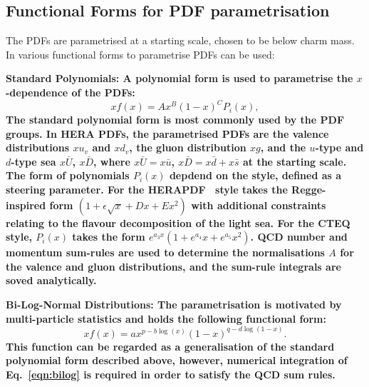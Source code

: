 \subsection{Functional Forms for PDF parametrisation}
The PDFs are parametrised at a starting scale, chosen to be below charm mass.
In \fitter various functional forms to parametrise PDFs can be used:
\begin{description}
\item \bf {Standard Polynomials:} \rm
A polynomial form is used to parametrise the $x$-dependence of the PDFs:
\begin{equation}
 xf(x) = A x^{B} (1-x)^{C} P_i(x),
\label{eqn:pdf_std}
\end{equation}
The standard polynomial form is most commonly used by the PDF groups.
In HERA PDFs, the parametrised PDFs are the valence distributions
$xu_v$ and $xd_v$, the gluon distribution $xg$, and the $u$-type and $d$-type sea 
$x\bar{U}$, $x\bar{D}$, where $x\bar{U} = x\bar{u}$, 
$x\bar{D} = x\bar{d} +x\bar{s}$ at the starting scale. 
The form of polynomials $P_i(x)$ depdend on the style, defined as a steering parameter. 
For the HERAPDF~\cite{h1zeus:2009wt} style takes the Regge-inspired form  
$(1 + \epsilon \sqrt{x} + D x + E x^2)$
with additional constraints relating to the flavour decomposition of the 
light sea. 
For the CTEQ style, $P_i(x)$ takes the form $e^{a_3x} (1 + e^{a_4} x + e^{a_5} x^2)$.
QCD number and momentum sum-rules are used to determine the normalisations $A$ for the valence and gluon
distributions, and the sum-rule integrals are soved analytically.

\item \bf {Bi-Log-Normal Distributions:} \rm
The parametrisation is motivated by multi-particle statistics
and holds the following functional form:
\begin{equation}
 xf(x)=a x^{p-b\log(x)}(1-x)^{q-d \log(1-x)}.
\label{eqn:bilog}
\end{equation}
This function can be regarded as a generalisation of the standard polynomial form described above,
however, numerical integration of Eq.~\ref{eqn:bilog} is required in order to satisfy the QCD sum rules.


\end{description}
